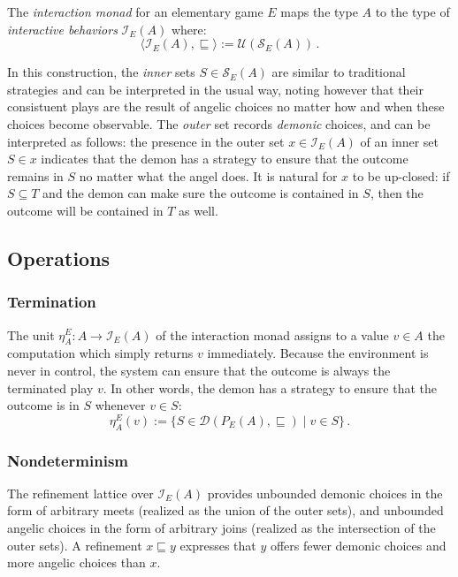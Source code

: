 \documentclass[sigplan,10pt,review,anonymous]{acmart}
\begin{document}
\begin{definition}
The \emph{interaction monad}
for an elementary game $E$
maps the type $A$ to the type of \emph{interactive behaviors}
$\mathcal{I}_E(A)$ where:
\[
  \langle \mathcal{I}_E(A), {\sqsubseteq} \rangle :=
    \mathcal{U}(\mathcal{S}_E(A)) \,.
\]
\end{definition}

In this construction,
the \emph{inner} sets $S \in \mathcal{S}_E(A)$
are similar to traditional strategies and
can be interpreted in the usual way,
noting however that their consistuent plays
are the result of angelic choices
no matter how and when these choices become observable.
The \emph{outer} set records \emph{demonic} choices,
and can be interpreted as follows:
the presence in the outer set $x \in \mathcal{I}_E(A)$
of an inner set $S \in x$
indicates that the demon has a strategy
to ensure that the outcome remains in $S$
no matter what the angel does.
It is natural for $x$ to be up-closed:
if $S \subseteq T$ and the demon can make sure
the outcome is contained in $S$,
then the outcome will be contained in $T$ as well.

\subsection{Operations}

\subsubsection{Termination}

The unit $\eta^E_A : A \rightarrow \mathcal{I}_E(A)$
of the interaction monad
assigns to a value $v \in A$ the computation
which simply returns $v$ immediately.
Because the environment is never in control,
the system can ensure that the outcome is always
the terminated play $v$.
In other words,
the demon has a strategy to ensure that the outcome is in $S$
whenever $v \in S$:
\[
  \eta^E_A(v) :=
    \{ S \in \mathcal{D}(P_E(A), {\sqsubseteq}) \mid v \in S \} \,.
\]

\subsubsection{Nondeterminism}

The refinement lattice over $\mathcal{I}_E(A)$
provides unbounded demonic choices
in the form of arbitrary meets
(realized as the union of the outer sets),
and unbounded angelic choices
in the form of arbitrary joins
(realized as the intersection of the outer sets).
A refinement $x \sqsubseteq y$ expresses that
$y$ offers fewer demonic choices and more angelic choices than $x$.
\end{document}
